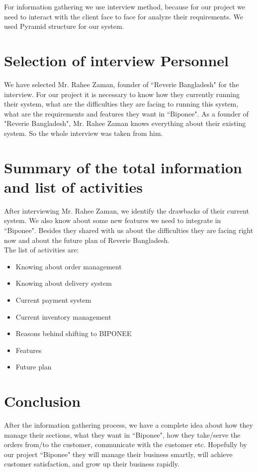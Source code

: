 For information gathering we use interview method, because for our project we need to interact with the client face to face for analyze their requirements. We used Pyramid structure for our system.


 \section{Selection of interview Personnel}
 We have selected Mr. Rahee Zaman, founder of ``Reverie Bangladesh" for the interview. For our project it is necessary to know how they currently running their system, what are the difficulties they are facing to running this system, what are the requirements and features they want in ``Biponee". As a founder of "Reverie Bangladesh", Mr. Rahee Zaman knows everything about their existing system. So the whole interview was taken from him.
 
  \section{Summary of the total information and list of activities}
  After interviewing Mr. Rahee Zaman, we identify the drawbacks of their current system. We also know about some new features we need to integrate in ``Biponee". Besides they shared with us about the difficulties they are facing right now and about the future plan of Reverie Bangladesh.  \\
  
  The list of activities   are:
  \begin{itemize}
  \item Knowing about order management
  \item Knowing about delivery system
  \item Current payment system
  \item Current inventory management
  \item  Reasons behind shifting to BIPONEE
   \item Features 
   \item Future plan
\end{itemize}

\section{Conclusion}
After the information gathering process, we have a complete idea  about how they manage their sections, what they want in ``Biponee", how they take/serve the orders from/to the customer, communicate with the customer etc. Hopefully by our project ``Biponee" they will manage their business smartly, will achieve customer satisfaction, and grow up their business rapidly.
  
  
  
 
 




